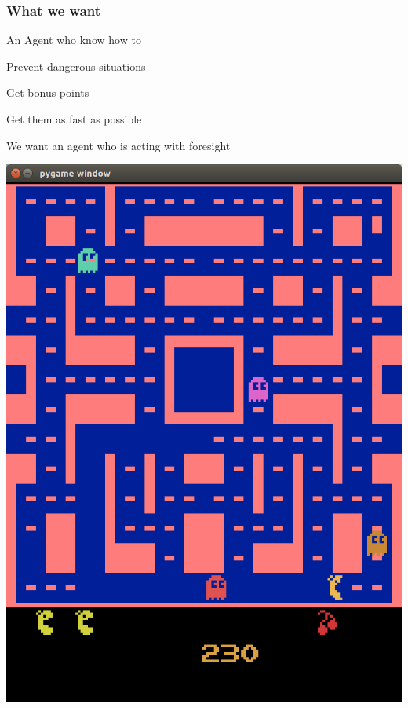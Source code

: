 \begin{frame}
    \frametitle{What we want}

\begin{multicols}{2}
	An Agent who know how to
	\begin{PraesentationAufzaehlung}
		\item Prevent dangerous situations
		\item Get bonus points
		\item Get them as fast as possible
	\end{PraesentationAufzaehlung}
	We want an agent who is acting with foresight
    \vfill\columnbreak
	\begin{center}
    \includegraphics[height=.6\textheight]{./Images/screenshot_ghost.png}%
	\end{center}
\end{multicols}


\end{frame}
\clearpage



